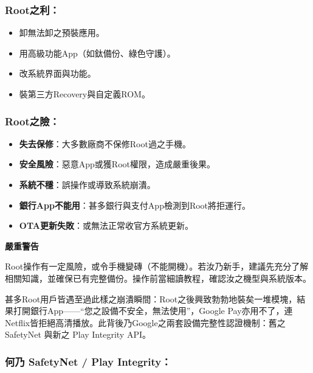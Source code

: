 \subsubsection*{Root之利：}

\begin{itemize}
  \item 卸無法卸之預裝應用。
  \item 用高級功能App（如鈦備份、綠色守護）。
  \item 改系統界面與功能。
  \item 裝第三方Recovery與自定義ROM。
\end{itemize}

\subsubsection*{Root之險：}

\begin{itemize}
  \item \textbf{失去保修}：大多數廠商不保修Root過之手機。
  \item \textbf{安全風險}：惡意App或獲Root權限，造成嚴重後果。
  \item \textbf{系統不穩}：誤操作或導致系統崩潰。
  \item \textbf{銀行App不能用}：甚多銀行與支付App檢測到Root將拒運行。
  \item \textbf{OTA更新失敗}：或無法正常收官方系統更新。
\end{itemize}

\textbf{嚴重警告}\par

Root操作有一定風險，或令手機變磚（不能開機）。若汝乃新手，建議先充分了解相關知識，並確保已有完整備份。操作前當細讀教程，確認汝之機型與系統版本。


甚多Root用戶皆遇至過此樣之崩潰瞬間：Root之後興致勃勃地裝矣一堆模塊，結果打開銀行App——“您之設備不安全，無法使用”，Google Pay亦用不了，連Netflix皆拒絕高清播放。此背後乃Google之兩套設備完整性認證機制：舊之 SafetyNet 與新之 Play Integrity API。

\subsubsection*{何乃 SafetyNet / Play Integrity：}

